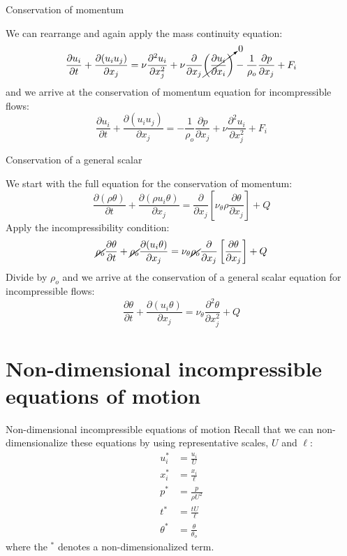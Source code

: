 
\begin{frame}{Conservation of momentum}

We can rearrange and again apply the mass continuity equation:
$$\frac{\partial u_i}{\partial t} + \frac{\partial (u_i u_j)}{\partial x_j} = \nu \frac{\partial^2 u_i}{\partial x_j^2} + \nu\frac{\partial}{\partial x_j}\cancelto{0}{\left(\frac{\partial u_i}{\partial x_i}\right)} - \frac{1}{\rho_o}\frac{\partial p}{\partial x_j} + F_i$$
and we arrive at the conservation of momentum equation for incompressible flows:
$$\boxed{\frac{\partial u_i}{\partial t} + \frac{\partial (u_i u_j)}{\partial x_j} = - \frac{1}{\rho_o}\frac{\partial p}{\partial x_j} + \nu \frac{\partial^2 u_i}{\partial x_j^2} + F_i}$$
\end{frame}


\begin{frame}{Conservation of a general scalar}

We start with the full equation for the conservation of momentum:
$$\frac{\partial (\rho \theta)}{\partial t} + \frac{\partial (\rho u_i \theta)}{\partial x_j} = \frac{\partial}{\partial x_j}\left[ \nu_{\theta} \rho \frac{\partial \theta}{\partial x_j}\right] + Q$$
Apply the incompressibility condition:
$$\cancel{\rho_o} \frac{\partial \theta}{\partial t} + \cancel{\rho_o} \frac{\partial (u_i \theta)}{\partial x_j} = \nu_{\theta} \cancel{\rho_o}\frac{\partial}{\partial x_j}\left[\frac{\partial \theta}{\partial x_j}\right] + Q$$
Divide by $\rho_o$ and we arrive at the conservation of a general scalar equation for incompressible flows:
$$\boxed{\frac{\partial \theta}{\partial t} + \frac{\partial (u_i \theta)}{\partial x_j} = \nu_{\theta}\frac{\partial^2 \theta}{\partial x_j^2} + Q}$$
\end{frame}

\section{Non-dimensional incompressible equations of motion} %

\begin{frame}{Non-dimensional incompressible equations of motion}
Recall that we can non-dimensionalize these equations by using representative scales, $U$ and $\ell$:
\begin{align*}
u_i^* &= \frac{u_i}{U}\\
x_i^* &= \frac{x_i}{\ell}\\
p^* &= \frac{p}{\rho U^2}\\
t^* &= \frac{t U}{\ell}\\
\theta^* &= \frac{\theta}{\theta_o}
\end{align*}
where the $^*$ denotes a non-dimensionalized term.
\end{frame}

